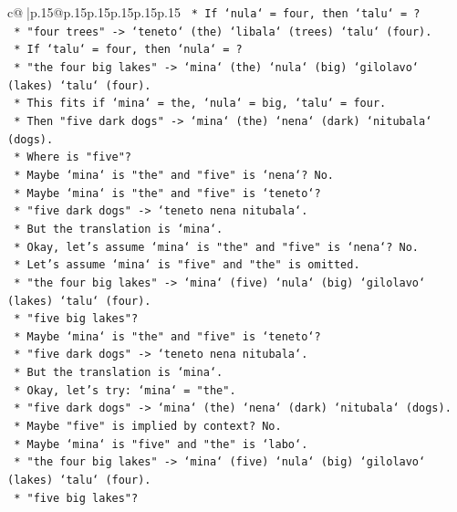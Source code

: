 \documentclass{article}
\begin{document}
{\begin{supertabular}{c@{$\;$}|p{.15\linewidth}@{}p{.15\linewidth}p{.15\linewidth}p{.15\linewidth}p{.15\linewidth}p{.15\linewidth}}
{{{\texttt{    *   If `nula` = four, then `talu` = ?} \\
\texttt{    *   "four trees" {-}> `teneto` (the) `libala` (trees) `talu` (four).} \\
\texttt{    *   If `talu` = four, then `nula` = ?} \\
\texttt{    *   "the four big lakes" {-}> `mina` (the) `nula` (big) `gilolavo` (lakes) `talu` (four).} \\
\texttt{    *   This fits if `mina` = the, `nula` = big, `talu` = four.} \\
\texttt{    *   Then "five dark dogs" {-}> `mina` (the) `nena` (dark) `nitubala` (dogs).} \\
\texttt{    *   Where is "five"?} \\
\texttt{    *   Maybe `mina` is "the" and "five" is `nena`? No.} \\
\texttt{    *   Maybe `mina` is "the" and "five" is `teneto`?} \\
\texttt{    *   "five dark dogs" {-}> `teneto nena nitubala`.} \\
\texttt{    *   But the translation is `mina`.} \\
\texttt{    *   Okay, let's assume `mina` is "the" and "five" is `nena`? No.} \\
\texttt{    *   Let's assume `mina` is "five" and "the" is omitted.} \\
\texttt{    *   "the four big lakes" {-}> `mina` (five) `nula` (big) `gilolavo` (lakes) `talu` (four).} \\
\texttt{    *   "five big lakes"?} \\
\texttt{    *   Maybe `mina` is "the" and "five" is `teneto`?} \\
\texttt{    *   "five dark dogs" {-}> `teneto nena nitubala`.} \\
\texttt{    *   But the translation is `mina`.} \\
\texttt{    *   Okay, let's try: `mina` = "the".} \\
\texttt{    *   "five dark dogs" {-}> `mina` (the) `nena` (dark) `nitubala` (dogs).} \\
\texttt{    *   Maybe "five" is implied by context? No.} \\
\texttt{    *   Maybe `mina` is "five" and "the" is `labo`.} \\
\texttt{    *   "the four big lakes" {-}> `mina` (five) `nula` (big) `gilolavo` (lakes) `talu` (four).} \\
\texttt{    *   "five big lakes"?} \\
}}}
\end{supertabular}}
\end{document}
